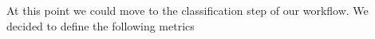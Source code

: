 \begin{multicols}{2}
At this point we could move to the classification step of our workflow. We decided to define the following  metrics


\end{multicols}